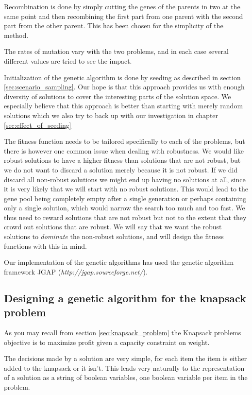 Recombination is done by simply cutting the genes of the parents in
two at the same point and then recombining the first part from one
parent with the second part from the other parent. This has been
chosen for the simplicity of the method. 

The rates of mutation vary with the two problems, and in each case
several different values are tried to see the impact.

Initialization of the genetic algorithm is done by seeding as
described in section \ref{sec:scenario_sampling}. Our hope is that
this approach provides us with enough diversity of solutions to cover
the interesting parts of the solution space. We especially believe
that this approach is better than starting with merely random
solutions which we also try to back up with our investigation in
chapter \ref{sec:effect_of_seeding}

The fitness function needs to be tailored specifically to each of the
problems, but there is however one common issue when dealing with
robustness. We would like robust solutions to have a higher fitness
than solutions that are not robust, but we do not want to discard a
solution merely because it is not robust. If we did discard all
non-robust solutions we might end up having no solutions at all, since
it is very likely that we will start with no robust solutions. This
would lead to the gene pool being completely empty after a single
generation or perhaps containing only a single solution, which would
narrow the search too much and too fast. We thus need to reward
solutions that are not robust but not to the extent that they crowd
out solutions that are robust. We will say that we want the robust
solutions to \emph{dominate} the non-robust solutions, and will design
the fitness functions with this in mind.

Our implementation of the genetic algorithms has used the genetic
algorithm framework JGAP (\emph{http://jgap.sourceforge.net/}).

\subsection{Designing a genetic algorithm for the knapsack problem}
\label{sec:ga_kp}
As you may recall from section \ref{sec:knapsack_problem} the Knapsack
problems objective is to maximize profit given a capacity constraint
on weight.

The decisions made by a solution are very simple, for each item the
item is either added to the knapsack or it isn't. This leads very
naturally to the representation of a solution as a string of boolean
variables, one boolean variable per item in the problem.


